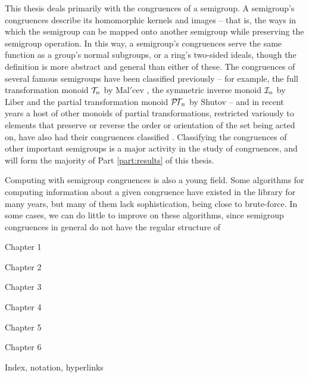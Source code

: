 This thesis deals primarily with the congruences of a semigroup.  A semigroup's
congruences describe its homomorphic kernels and images -- that is, the ways in
which the semigroup can be mapped onto another semigroup while preserving the
semigroup operation.  In this way, a semigroup's congruences serve the same
function as a group's normal subgroups, or a ring's two-sided ideals, though the
definition is more abstract and general than either of these.  The congruences
of several famous semigroups have been classified previously -- for example, the
full transformation monoid $\mathcal{T}_n$ by Mal$'$cev \cite{malcev_1952}, the symmetric
inverse monoid $\mathcal{I}_n$ by Liber \cite{liber_1953} and the partial transformation
monoid $\mathcal{P\!T\!}_n$ by Shutov \cite{shutov_1988} -- and in recent years a host of
other monoids of partial transformations, restricted variously to elements that
preserve or reverse the order or orientation of the set being acted on, have
also had their congruences classified \cite{fernandes_2000, lisbon_ii,
  lisbon_i}.  Classifying the congruences of other important semigroups is a
major activity in the study of congruences, and will form the majority of Part
\ref{part:results} of this thesis.

Computing with semigroup congruences is also a young field.  Some algorithms for
computing information about a given congruence have existed in the \GAP{}
library for many years, but many of them lack sophistication, being close to
brute-force.  In some cases, we can do little to improve on these algorithms,
since semigroup congruences in general do not have the regular structure of

Chapter 1

Chapter 2

Chapter 3

Chapter 4

Chapter 5

Chapter 6

Index, notation, hyperlinks

